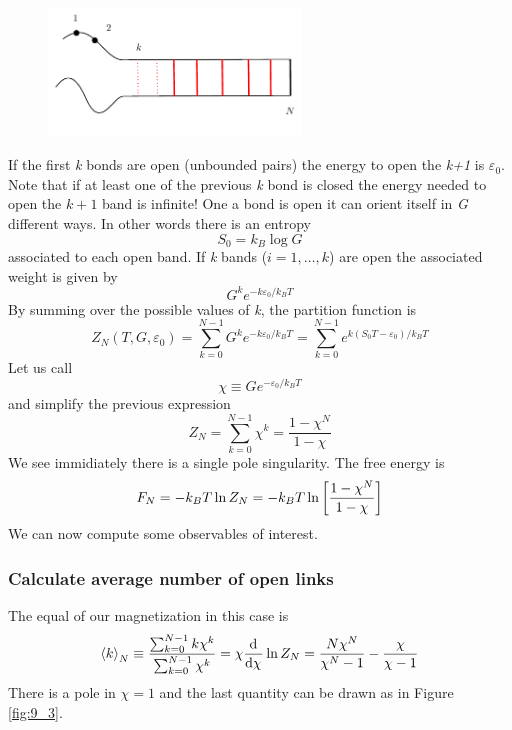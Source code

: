 \documentclass[../main/main.tex]{subfiles}
\begin{document}
\begin{figure}[h!]
\centering
\includegraphics[width=0.6\textwidth]{../lessons/9_image/2.pdf}
\caption{\label{fig:9_2} }
\end{figure}
If the first \emph{k} bonds are open (unbounded pairs) the energy to open the \emph{k+1} is \( \varepsilon _0 \). Note that if at least one of the previous \emph{k} bond is closed the energy needed to open the \( k+1 \) band is infinite! One a bond is open it can orient itself in \emph{G} different ways. In other words there is an entropy
\begin{equation}
  S_0 = k_B \log{G}
\end{equation}
associated to each open band. If \emph{k} bands (\( i=1,\dots,k \)) are open the associated weight is given by
\begin{equation}
  G^k e^{-k \varepsilon _0/k_B T}
\end{equation}
By summing over the possible values of \emph{k}, the partition function is
\begin{equation}
  Z_N (T,G, \varepsilon _0) = \sum_{k=0}^{N-1}  G^k e^{-k \varepsilon _0/k_B T} = \sum_{k=0}^{N-1} e^{k(S_0 T - \varepsilon _0)/k_B T}
\end{equation}
Let us call
\begin{equation}
  \chi \equiv G e^{-\varepsilon _0/k_B T}
\end{equation}
and simplify the previous expression
\begin{equation}
  Z_N = \sum_{k=0}^{N-1} \chi ^k = \frac{1-\chi^N}{1-\chi}
\end{equation}
We see immidiately there is a single pole singularity. The free energy is
\begin{equation}
  F_N = -k_B T \ln{Z_N} = -k_B T \ln{\qty[\frac{1-\chi^N}{1-\chi}]}
\end{equation}
We can now compute some observables of interest.

\subsubsection{Calculate average number of open links}
The equal of our magnetization in this case is
\begin{equation}
  \expval{k}_N \equiv  \frac{\sum_{k=0}^{N-1} k \chi^k}{\sum_{k=0}^{N-1} \chi^k } = \chi \dv[]{}{\chi} \ln{Z_N}  = \frac{N \chi^N}{\chi^N-1} - \frac{\chi}{\chi-1}
\end{equation}
There is a pole in \( \chi =1 \) and the last quantity can be drawn as in Figure \ref{fig:9_3}.
\end{document}
